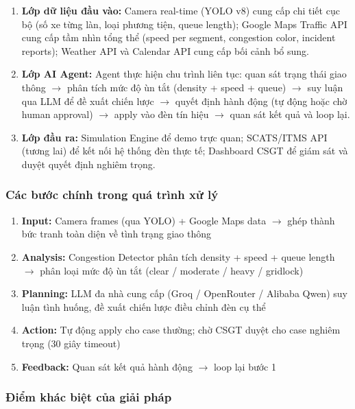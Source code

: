 \documentclass[12pt,a4paper]{article}
\begin{document}
\begin{enumerate}
    \item \textbf{Lớp dữ liệu đầu vào:} Camera real-time (YOLO v8) cung cấp chi tiết cục bộ (số xe từng làn, loại phương tiện, queue length); Google Maps Traffic API cung cấp tầm nhìn tổng thể (speed per segment, congestion color, incident reports); Weather API và Calendar API cung cấp bối cảnh bổ sung.

    \item \textbf{Lớp AI Agent:} Agent thực hiện chu trình liên tục: quan sát trạng thái giao thông $\rightarrow$ phân tích mức độ ùn tắt (density + speed + queue) $\rightarrow$ suy luận qua LLM để đề xuất chiến lược $\rightarrow$ quyết định hành động (tự động hoặc chờ human approval) $\rightarrow$ apply vào đèn tín hiệu $\rightarrow$ quan sát kết quả và loop lại.

    \item \textbf{Lớp đầu ra:} Simulation Engine để demo trực quan; SCATS/ITMS API (tương lai) để kết nối hệ thống đèn thực tế; Dashboard CSGT để giám sát và duyệt quyết định nghiêm trọng.
\end{enumerate}

\subsubsection{Các bước chính trong quá trình xử lý}

\begin{enumerate}
    \item \textbf{Input:} Camera frames (qua YOLO) + Google Maps data $\rightarrow$ ghép thành bức tranh toàn diện về tình trạng giao thông
    \item \textbf{Analysis:} Congestion Detector phân tích density + speed + queue length $\rightarrow$ phân loại mức độ ùn tắt (clear / moderate / heavy / gridlock)
    \item \textbf{Planning:} LLM đa nhà cung cấp (Groq / OpenRouter / Alibaba Qwen) suy luận tình huống, đề xuất chiến lược điều chỉnh đèn cụ thể
    \item \textbf{Action:} Tự động apply cho case thường; chờ CSGT duyệt cho case nghiêm trọng (30 giây timeout)
    \item \textbf{Feedback:} Quan sát kết quả hành động $\rightarrow$ loop lại bước 1
\end{enumerate}

\subsubsection{Điểm khác biệt của giải pháp}
\end{document}
